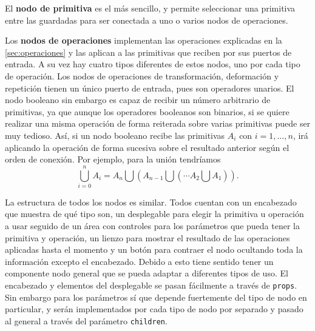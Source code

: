El \textbf{nodo de primitiva} es el más sencillo, y permite seleccionar una primitiva entre las guardadas para ser conectada a uno o varios nodos de operaciones.\newline

Los \textbf{nodos de operaciones} implementan las operaciones explicadas en la \autoref{sec:operaciones} y las aplican a las primitivas que reciben por sus puertos de entrada. A su vez hay cuatro tipos diferentes de estos nodos, uno por cada tipo de operación. Los nodos de operaciones de transformación, deformación y repetición tienen un único puerto de entrada, pues son operadores unarios. El nodo booleano sin embargo es capaz de recibir un número arbitrario de primitivas, ya que aunque los operadores booleanos son binarios, si se quiere realizar una misma operación de forma reiterada sobre varias primitivas puede ser muy tedioso. Así, si un nodo booleano recibe las primitivas $A_i$ con $i=1,\dots, n$, irá aplicando la operación de forma sucesiva sobre el resultado anterior según el orden de conexión. Por ejemplo, para la unión tendríamos
\begin{equation*}
    \bigcup_{i=0}^n A_i = A_n\bigcup (A_{n-1} \bigcup ( \cdots A_2 \bigcup A_1)).
\end{equation*}

La estructura de todos los nodos es similar. Todos cuentan con un encabezado que muestra de qué tipo son, un desplegable para elegir la primitiva u operación a usar seguido de un área con controles para los parámetros que pueda tener la primitiva y operación, un lienzo para mostrar el resultado de las operaciones aplicadas hasta el momento y un botón para contraer el nodo ocultando toda la información excepto el encabezado. Debido a esto tiene sentido tener un componente nodo general que se pueda adaptar a diferentes tipos de uso. El encabezado y elementos del desplegable se pasan fácilmente a través de \texttt{props}. Sin embargo para los parámetros sí que depende fuertemente del tipo de nodo en particular, y serán implementados por cada tipo de nodo por separado y pasado al general a través del parámetro \texttt{children}.\newline

